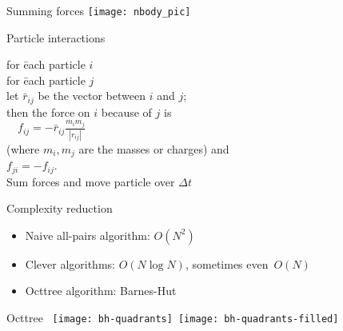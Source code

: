 
\begin{frame}{Summing forces}
  \texttt{[image: nbody\_pic]}
\end{frame}

\begin{frame}{Particle interactions}
  \begin{tabbing}
    for \=each particle $i$\\
    \>for \= each particle $j$\\
    \>\> let $\bar r_{ij}$ be the vector between $i$ and $j$;\\
    \>\> then the force on $i$ because of $j$ is\\
    \>\> $\quad f_{ij} = -\bar r_{ij}\frac{m_im_j}{|r_{ij}|}$\\
    \>\> (where $m_i,m_j$ are the masses or charges) and\\
    \>\> $f_{ji}=-f_{ij}$.\\
    \>Sum forces and move particle over $\Delta t$\\
  \end{tabbing}
\end{frame}

\begin{frame}{Complexity reduction}
  \begin{itemize}
  \item Naive all-pairs algorithm: $O(N^2)$
  \item Clever algorithms: $O(N\log N)$, sometimes even~$O(N)$
  \item Octtree algorithm: Barnes-Hut
  \end{itemize}  
\end{frame}

\begin{frame}{Octtree}
    \hbox{%
  \texttt{[image: bh-quadrants]}
  \texttt{[image: bh-quadrants-filled]}%
  }
\end{frame}

